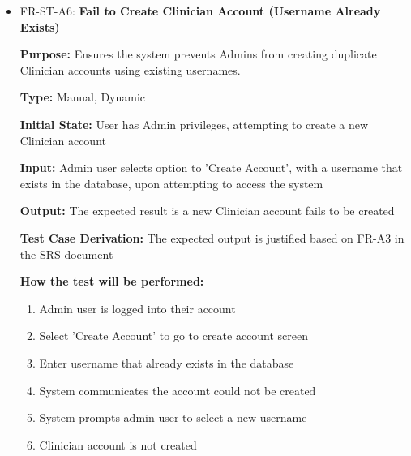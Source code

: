 \documentclass[12pt, titlepage]{article}
\begin{document}
\begin{itemize}
  \item FR-ST-A6: \textbf{Fail to Create Clinician Account (Username Already Exists)}
  \begin{mdframed}[linewidth=0.5mm]
      \textbf{Purpose:} Ensures the system prevents Admins from creating duplicate Clinician accounts using existing usernames. \par
      \textbf{Type:} Manual, Dynamic \par
      \textbf{Initial State:} User has Admin privileges, attempting to create a new Clinician account \par
      \textbf{Input:} Admin user selects option to 'Create Account', with a username that exists in the database, upon attempting to access the system \par
      \textbf{Output:} The expected result is a new Clinician account fails to be created \par
      \textbf{Test Case Derivation:} The expected output is justified based on FR-A3 in the SRS document \par
      \textbf{How the test will be performed:}
      \begin{enumerate}[noitemsep]
        \item Admin user is logged into their account
        \item Select 'Create Account' to go to create account screen
        \item Enter username that already exists in the database
        \item System communicates the account could not be created
        \item System prompts admin user to select a new username
        \item Clinician account is not created
      \end{enumerate}
  \end{mdframed}


\end{itemize}
\end{document}
